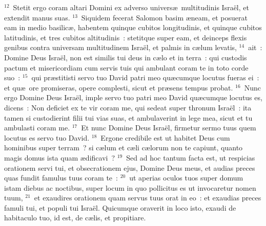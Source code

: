${}^{12}$~Stetit ergo coram altari Domini ex adverso univers\ae\ multitudinis Isra\"el, et extendit manus suas.
${}^{13}$~Siquidem fecerat Salomon basim \ae neam, et posuerat eam in medio basilic\ae , habentem quinque cubitos longitudinis, et quinque cubitos latitudinis, et tres cubitos altitudinis~: stetitque super eam, et deinceps flexis genibus contra universam multitudinem Isra\"el, et palmis in c\ae lum levatis,
${}^{14}$~ait~: Domine Deus Isra\"el, non est similis tui deus in c\ae lo et in terra~: qui custodis pactum et misericordiam cum servis tuis qui ambulant coram te in toto corde suo~:
${}^{15}$~qui pr\ae stitisti servo tuo David patri meo qu\ae cumque locutus fueras ei~: et qu\ae\ ore promiseras, opere complesti, sicut et pr\ae sens tempus probat.
${}^{16}$~Nunc ergo Domine Deus Isra\"el, imple servo tuo patri meo David qu\ae cumque locutus es, dicens~: Non deficiet ex te vir coram me, qui sedeat super thronum Isra\"el~: ita tamen si custodierint filii tui vias suas, et ambulaverint in lege mea, sicut et tu ambulasti coram me.
${}^{17}$~Et nunc Domine Deus Isra\"el, firmetur sermo tuus quem locutus es servo tuo David.
${}^{18}$~Ergone credibile est ut habitet Deus cum hominibus super terram~? si c\ae lum et c\ae li c\ae lorum non te capiunt, quanto magis domus ista quam \ae dificavi~?
${}^{19}$~Sed ad hoc tantum facta est, ut respicias orationem servi tui, et obsecrationem ejus, Domine Deus meus, et audias preces quas fundit famulus tuus coram te~:
${}^{20}$~ut aperias oculos tuos super domum istam diebus ac noctibus, super locum in quo pollicitus es ut invocaretur nomen tuum,
${}^{21}$~et exaudires orationem quam servus tuus orat in eo~: et exaudias preces famuli tui, et populi tui Isra\"el. Quicumque oraverit in loco isto, exaudi de habitaculo tuo, id est, de c\ae lis, et propitiare.



